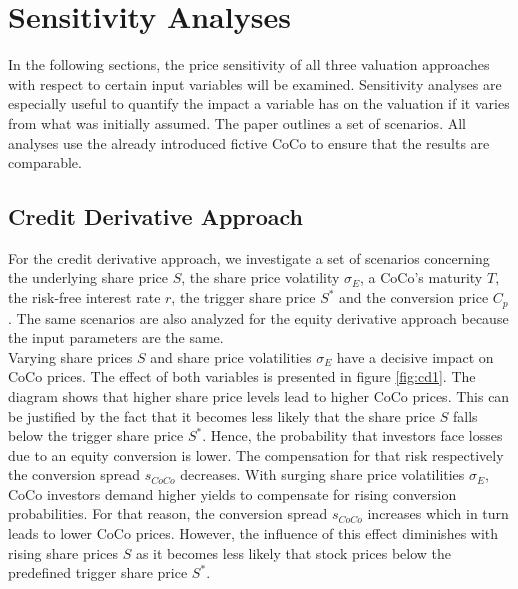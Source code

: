 \chapter{Sensitivity Analyses}
In the following sections, the price sensitivity of all three valuation approaches with respect to certain input variables will be examined. Sensitivity analyses are especially useful to quantify the impact a variable has on the valuation if it varies from what was initially assumed. The paper outlines a set of scenarios. All analyses use the already introduced fictive CoCo to ensure that the results are comparable.

\section{Credit Derivative Approach}\label{sensicredit}

For the credit derivative approach, we investigate a set of scenarios concerning the underlying share price $S$, the share price volatility $\sigma_E$, a CoCo's maturity $T$, the risk-free interest rate $r$, the trigger share price $S^*$ and the conversion price $C_p$. The same scenarios are also analyzed for the equity derivative approach because the input parameters are the same.\\

Varying share prices $S$ and share price volatilities $\sigma_E$ have a decisive impact on CoCo prices. The effect of both variables is presented in figure \ref{fig:cd1}. The diagram shows that higher share price levels lead to higher CoCo prices. This can be justified by the fact that it becomes less likely that the share price $S$ falls below the trigger share price $S^*$. Hence, the probability that investors face losses due to an equity conversion is lower. The compensation for that risk respectively the conversion spread $s_{CoCo}$ decreases. With surging share price volatilities $\sigma_E$, CoCo investors demand higher yields to compensate for rising conversion probabilities. For that reason, the conversion spread $s_{CoCo}$ increases which in turn leads to lower CoCo prices. However, the influence of this effect diminishes with rising share prices $S$ as it becomes less likely that stock prices below the predefined trigger share price $S^*$.\\


